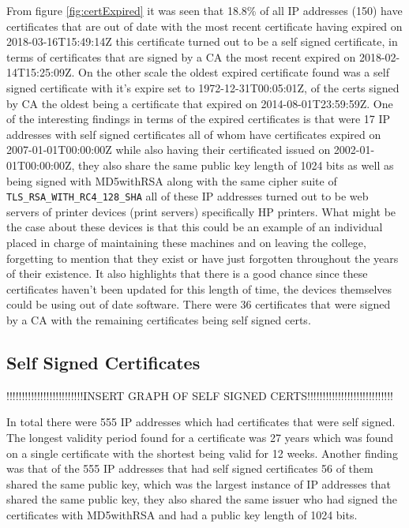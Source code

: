 \documentclass[a4wide,leqno,12pt]{report}
\begin{document}
From figure \ref{fig:certExpired} it was seen that 18.8\% of all IP addresses (150) have certificates that are out of date with the most recent certificate having expired on 2018-03-16T15:49:14Z this certificate turned out to be a self signed certificate, in terms of certificates that are signed by a CA the most recent expired on 2018-02-14T15:25:09Z. On the other scale the oldest expired certificate found was a self signed certificate with it's expire set to 1972-12-31T00:05:01Z, of the certs signed by CA the oldest being a certificate that expired on 2014-08-01T23:59:59Z. One of the interesting findings in terms of the expired certificates is that were 17 IP addresses with self signed certificates all of whom have certificates expired on 2007-01-01T00:00:00Z while also having their certificated issued on 2002-01-01T00:00:00Z, they also share the same public key length of 1024 bits as well as being signed with MD5withRSA along with the same cipher suite of \texttt{TLS\_RSA\_WITH\_RC4\_128\_SHA} all of these IP addresses turned out to be web servers of printer devices (print servers) specifically HP printers. What might be the case about these devices is that this could be an example of an individual placed in charge of maintaining these machines and on leaving the college, forgetting to mention that they exist or have just  forgotten throughout the years of their existence. It also highlights that there is a good chance since these certificates haven't been updated for this length of time, the devices themselves could be using out of date software. There were 36 certificates that were signed by a CA with the remaining certificates being self signed certs.

\subsection{Self Signed Certificates}


!!!!!!!!!!!!!!!!!!!!!!!!!INSERT GRAPH OF SELF SIGNED CERTS!!!!!!!!!!!!!!!!!!!!!!!!!!!!

In total there were 555 IP addresses which had certificates that were self signed. The longest validity period found for a certificate was 27 years which was found on a single certificate with the shortest being valid for 12 weeks. Another finding was that of the 555 IP addresses that had self signed certificates 56 of them shared the same public key, which was the largest instance of IP addresses that shared the same public key, they also shared the same issuer who had signed the certificates with MD5withRSA and had a public key length of 1024 bits.
\end{document}
